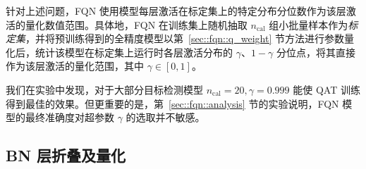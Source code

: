 针对上述问题，FQN 使用模型每层激活在标定集上的特定分布分位数作为该层激活的量化数值范围。具体地，FQN 在训练集上随机抽取 $n_{\mathrm{cal}}$ 组小批量样本作为\emph{标定集}，并将预训练得到的全精度模型以第~\ref{sec::fqn::q_weight} 节方法进行参数量化后，统计该模型在标定集上运行时各层激活分布的 $\gamma$、$1-\gamma$ 分位点，将其直接作为该层激活的量化范围，其中 $\gamma \in [0, 1]$。

我们在实验中发现，对于大部分目标检测模型 $n_{\mathrm{cal}} = 20, \gamma = 0.999$ 能使 QAT 训练得到最佳的效果。但更重要的是，第~\ref{sec::fqn::analysis} 节的实验说明，FQN 模型的最终准确度对超参数 $\gamma$ 的选取并不敏感。
\subsection{BN 层折叠及量化} \label{sec::fqn::q_bn}

